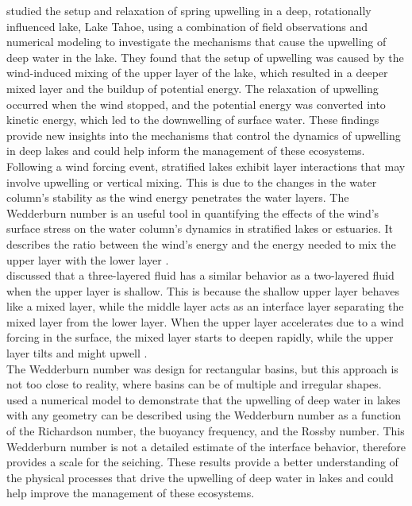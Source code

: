\documentclass[tesis.tex]{subfiles}
\begin{document}
\cite{roberts2021setup} studied the setup and relaxation of spring upwelling in a deep, rotationally influenced lake, Lake Tahoe, using a combination of field observations and numerical modeling to investigate the mechanisms that cause the upwelling of deep water in the lake. They found that the setup of upwelling was caused by the wind-induced mixing of the upper layer of the lake, which resulted in a deeper mixed layer and the buildup of potential energy. The relaxation of upwelling occurred when the wind stopped, and the potential energy was converted into kinetic energy, which led to the downwelling of surface water. These findings provide new insights into the mechanisms that control the dynamics of upwelling in deep lakes and could help inform the management of these ecosystems.\\

Following a wind forcing event, stratified lakes exhibit layer interactions that may involve upwelling or vertical mixing. This is due to the changes in the water column's stability as the wind energy penetrates the water layers. The Wedderburn number is an useful tool in quantifying the effects of the wind's surface stress on the water column's dynamics in stratified lakes or estuaries. It describes the ratio between the wind's energy and the energy needed to mix the upper layer with the lower layer \citep{jenkins1984response}.\\

\cite{Monismith1985} discussed that a three-layered fluid has a similar behavior as a two-layered fluid when the upper layer is shallow. This is because the shallow upper layer behaves like a mixed layer, while the middle layer acts as an interface layer separating the mixed layer from the lower layer. When the upper layer accelerates due to a wind forcing in the surface, the mixed layer starts to deepen rapidly, while the upper layer tilts and might upwell \citep{monismith2006vertical}.\\

The Wedderburn number was design for rectangular basins, but this approach is not too close to reality, where basins can be of multiple and irregular shapes. \cite{Shintani2010} used a numerical model to demonstrate that the upwelling of deep water in lakes with any geometry can be described using the Wedderburn number as a function of the Richardson number, the buoyancy frequency, and the Rossby number. This Wedderburn number is not a detailed estimate of the interface behavior, therefore provides a scale for the seiching. These results provide a better understanding of the physical processes that drive the upwelling of deep water in lakes and could help improve the management of these ecosystems.\\
\end{document}
